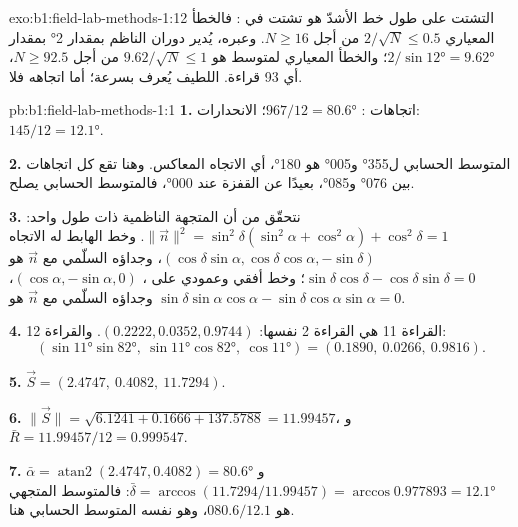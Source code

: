 \begin{solution}{exo:b1:field-lab-methods-1:12}
التشتت على طول خط  الأشدّ هو تشتت في : فالخطأ المعياري $2/\sqrt N \le 0.5$ من أجل $N \ge 16$. وعبره، يُدير دوران الناظم بمقدار \ang{2}  بمقدار $2/\sin\ang{12} = \ang{9.62}$؛ والخطأ المعياري لمتوسط  هو $9.62/\sqrt N \le 1$ من أجل $N \ge 92.5$، أي 93 قراءة.  اللطيف يُعرف بسرعة؛ أما اتجاهه فلا.
\end{solution}

\begin{solution}{pb:b1:field-lab-methods-1:1}
\textbf{1.} اتجاهات : $967/12 = \ang{80.6}$؛ الانحدارات: $145/12 =
\ang{12.1}$.

\textbf{2.} المتوسط الحسابي ل\ang{355} و\ang{005} هو \ang{180}، أي الاتجاه المعاكس. وهنا تقع كل اتجاهات  بين \ang{076} و\ang{085}، بعيدًا عن القفزة عند \ang{000}، فالمتوسط الحسابي يصلح.

\textbf{3.} نتحقّق من أن المتجهة الناظمية ذات طول واحد: $\|\vec n\|^2 = \sin^2\delta(\sin^2\alpha + \cos^2\alpha) +
\cos^2\delta = 1$. وخط  الهابط له الاتجاه
$(\cos\delta\sin\alpha, \cos\delta\cos\alpha, -\sin\delta)$، وجداؤه السلّمي مع $\vec n$ هو $\sin\delta\cos\delta - \cos\delta\sin\delta = 0$؛ وخط  أفقي وعمودي على ، $(\cos\alpha, -\sin\alpha, 0)$، وجداؤه السلّمي مع $\vec n$ هو
$\sin\delta\sin\alpha\cos\alpha - \sin\delta\cos\alpha\sin\alpha = 0$.

\textbf{4.} القراءة 11 هي القراءة 2 نفسها: $(0.2222, 0.0352, 0.9744)$.
والقراءة 12:
\[
  (\sin\ang{11}\sin\ang{82},\ \sin\ang{11}\cos\ang{82},\ \cos\ang{11}) =
  (0.1890,\ 0.0266,\ 0.9816).
\]

\textbf{5.} $\vec S = (2.4747,\ 0.4082,\ 11.7294)$.

\textbf{6.} $\|\vec S\| = \sqrt{6.1241 + 0.1666 + 137.5788} = 11.99457$، و
$\bar R = 11.99457/12 = 0.999547$.

\textbf{7.} $\bar\alpha = \operatorname{atan2}(2.4747, 0.4082) = \ang{80.6}$
و$\bar\delta = \arccos(11.7294/11.99457) = \arccos 0.977893 = \ang{12.1}$:
فالمتوسط المتجهي هو $080.6/12.1$، وهو نفسه المتوسط الحسابي هنا.


\end{solution}
